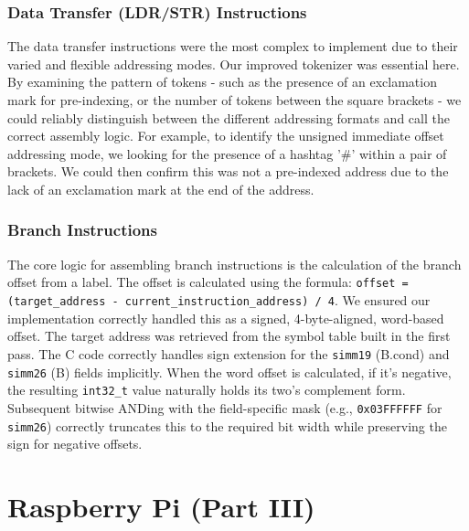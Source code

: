\documentclass[11pt]{article}
\begin{document}
\subsubsection{Data Transfer (LDR/STR) Instructions}
The data transfer instructions were the most complex to implement due to their varied and flexible addressing modes. Our improved tokenizer was essential here. By examining the pattern of tokens - such as the presence of an exclamation mark for pre-indexing, or the number of tokens between the square brackets - we could reliably distinguish between the different addressing formats and call the correct assembly logic.
For example, to identify the unsigned immediate offset addressing mode, we looking for the presence of a hashtag '\#' within a pair of brackets. We could then confirm this was not a pre-indexed address due to the lack of an exclamation mark at the end of the address.

\subsubsection{Branch Instructions}
The core logic for assembling branch instructions is the calculation of the branch offset from a label. The offset is calculated using the formula: \texttt{offset = (target\_address - current\_instruction\_address) / 4}. We ensured our implementation correctly handled this as a signed, 4-byte-aligned, word-based offset. The target address was retrieved from the symbol table built in the first pass. 
The C code correctly handles sign extension for the \texttt{simm19} (B.cond) and \texttt{simm26} (B) fields implicitly. When the word offset is calculated, if it's negative, the resulting \texttt{int32\_t} value naturally holds its two's complement form. Subsequent bitwise ANDing with the field-specific mask (e.g., \texttt{0x03FFFFFF} for \texttt{simm26}) correctly truncates this to the required bit width while preserving the sign for negative offsets.

\section{Raspberry Pi (Part III)}
\end{document}
